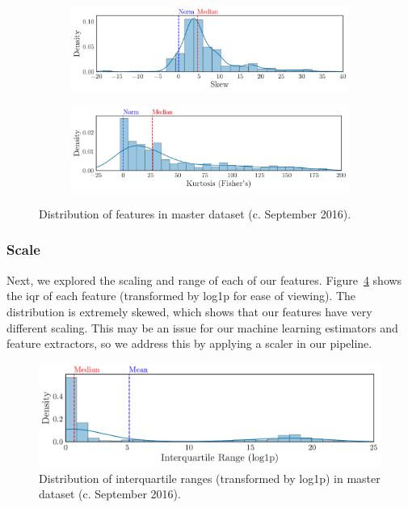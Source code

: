 \documentclass[../thesis/thesis.tex]{subfiles}
\begin{document}
\begin{figure}[!htb]
    \centering
    \begin{subfigure}{\textwidth}
        \includegraphics[width=\textwidth]{../figures/design/skew}
        \caption[Distribution of skew by feature]{}
        \label{fig:design:normality:skew}
    \end{subfigure}
    \begin{subfigure}{\textwidth}
        \includegraphics[width=\textwidth]{../figures/design/kurtosis}
        \caption[Distribution of kurtosis by feature]{}
        \label{fig:design:normality:kurtosis}
    \end{subfigure}
    \caption[Dataset normality]{Distribution of features in master dataset (c. September 2016).}
    \label{fig:design:normality}
\end{figure}

\subsubsection{Scale}

Next, we explored the scaling and range of each of our features. Figure~\ref{fig:design:scaling} shows the \gls{iqr} of each feature (transformed by log1p for ease of viewing). The distribution is extremely skewed, which shows that our features have very different scaling. This may be an issue for our machine learning estimators and feature extractors, so we address this by applying a scaler in our pipeline.

\begin{figure}[!htb]
    \centering
    \includegraphics[width=\textwidth]{../figures/design/scaling}
    \caption[Distribution of interquartile ranges]{Distribution of interquartile ranges (transformed by log1p) in master dataset (c. September 2016).}
    \label{fig:design:scaling}
\end{figure}
\end{document}
